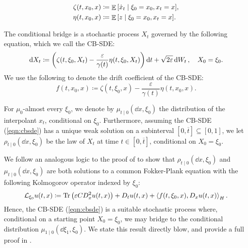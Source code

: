 \begin{align}
  \zeta(t, x_{0}, x) &\coloneqq \mathop{\mathbb{E}}\qty[\dot{x}_{t} \mid \xi_{0} = x_{0}, x_{t} = x],\label{eqn:condzetadef} \\
  \eta(t, x_{0}, x) &\coloneqq \mathop{\mathbb{E}}\qty[ z \mid \xi_{0} = x_{0}, x_{t} = x]. \label{eqn:condetadef}
\end{align}

The conditional bridge is a stochastic process \(X_{t}\) governed by the following equation, which we call the CB-SDE:
\begin{equation}
  \dd{X_{t}} \coloneqq \qty( \zeta(t, \xi_{0}, X_{t}) - \frac{\varepsilon}{\gamma(t)} \eta(t, \xi_{0}, X_{t})) \dd{t} + \sqrt{2\varepsilon} \dd{W_{t}}, \quad X_{0} = \xi_{0}. \label{eqn:cbsde}
\end{equation}
We use the following to denote the drift coefficient of the CB-SDE:
\[
  f(t, x_{0}, x) \coloneqq \zeta(t, \xi_{0}, x) - \frac{\varepsilon}{\gamma(t)} \eta(t, x_{0}, x).
\]

For \(\mu_{0}\)-almost every \(\xi_{0}\), we denote by \(\mu_{t \mid 0}( \dd{x}, \xi_{0})\) the distribution of the interpolant \(x_{t}\), conditional on \(\xi_{0}\). Furthermore, assuming the CB-SDE (\ref{eqn:cbsde}) has a unique weak solution on a subinterval \([0, \overline{t}] \subseteq [0, 1]\), we let \(\rho_{t \mid 0}(\dd{x}, \xi_{0})\) be the law of \(X_{t}\) at time \(t \in [0, \overline{t}]\), conditional on \(X_{0} = \xi_{0}\).

We follow an analogous logic to the proof of  to show that \(\rho_{t \mid 0}(\dd{x}, \xi_{0})\) and \(\mu_{t \mid 0}(\dd{x}, \xi_{0})\) are both solutions to a common Fokker-Plank equation with the following Kolmogorov operator indexed by \(\xi_{0}\):
\[
  \mathcal{L}_{\xi_{0}} u(t, x) \coloneqq \operatorname{Tr}\qty(\varepsilon C D^{2}_{x} u(t, x)) + D_{t}u(t, x) + \ev{f(t, \xi_{0}, x), D_{x} u(t, x)}_{H}.
\] Hence, the CB-SDE (\ref{eqn:cbsde}) is a suitable stochastic process where, conditional on a starting point \(X_{0} = \xi_{0}\), we may bridge to the conditional distribution \(\mu_{1 \mid 0}(\dd{\xi_{1}}, \xi_{0})\). We state this result directly blow, and provide a full proof in .

